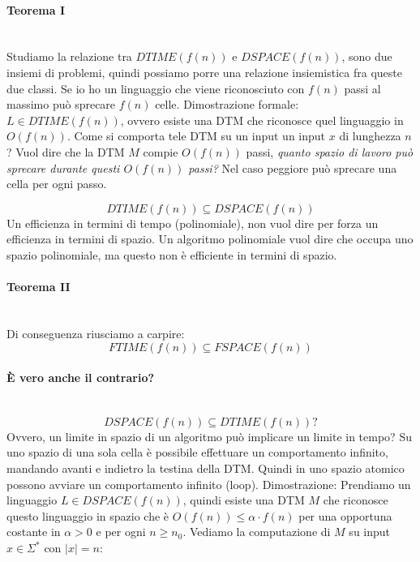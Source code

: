\documentclass{article}
\begin{document}
\paragraph{Teorema I}\mbox{}\\
Studiamo la relazione tra $DTIME(f(n))$ e $DSPACE(f(n))$, sono due insiemi di problemi, quindi
possiamo porre una relazione insiemistica fra queste due classi. Se io ho un linguaggio
che viene riconosciuto con $f(n)$ passi al massimo può sprecare $f(n)$ celle.
\newline\newline
Dimostrazione formale: $L\in DTIME(f(n))$, ovvero esiste una DTM che riconosce quel linguaggio in
$O(f(n))$. Come si comporta tele DTM su un input un input $x$ di lunghezza $n$?
Vuol dire che la DTM $M$ compie $O(f(n))$ passi,
\textit{quanto spazio di lavoro può sprecare durante questi $O(f(n))$ passi?} Nel caso peggiore
può sprecare una cella per ogni passo.

$$DTIME(f(n))\subseteq DSPACE(f(n))$$
Un efficienza in termini di tempo (polinomiale), non vuol dire per forza un efficienza in termini
di spazio. Un algoritmo polinomiale vuol dire che occupa uno spazio polinomiale, ma questo
non è efficiente in termini di spazio.

\paragraph{Teorema II}\mbox{}\\
Di conseguenza riusciamo a carpire:
$$FTIME(f(n))\subseteq FSPACE(f(n))$$

\paragraph{È vero anche il contrario?}\mbox{}\\
$$DSPACE(f(n))\subseteq DTIME(f(n))?$$
Ovvero, un limite in spazio di un algoritmo può implicare un limite in tempo? Su uno spazio
di una sola cella è possibile effettuare un comportamento infinito, mandando avanti e indietro
la testina della DTM. Quindi in uno spazio atomico possono avviare un comportamento infinito (loop).
\newline\newline
Dimostrazione: Prendiamo un linguaggio $L\in DSPACE(f(n))$, quindi esiste una DTM $M$ che riconosce
questo linguaggio in spazio che è $O(f(n))\leq\alpha\cdot f(n)$ per una opportuna costante in
$\alpha >0$ e per ogni $n\geq n_0$. Vediamo la computazione di $M$ su input $x\in\Sigma^*$ con $|x|=n$:
\end{document}
